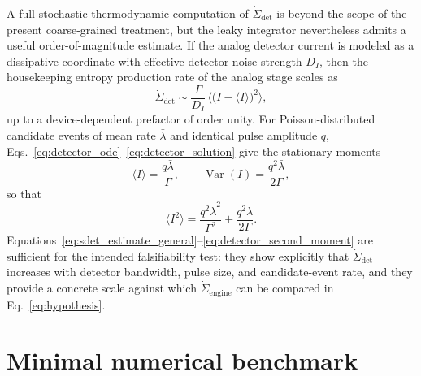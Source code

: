 \documentclass[aps,pre,reprint,amsmath,amssymb,floatfix,nofootinbib]{revtex4-2}
\newcommand{\avg}[1]{\langle #1 \rangle}
\newcommand{\Sdot}{\dot{\Sigma}}
\begin{document}
A full stochastic-thermodynamic computation of $\Sdot_{\mathrm{det}}$ is
beyond the scope of the present coarse-grained treatment, but the leaky
integrator nevertheless admits a useful order-of-magnitude estimate. If the
analog detector current is modeled as a dissipative coordinate with
effective detector-noise strength $D_I$, then the housekeeping entropy
production rate of the analog stage scales as
\begin{equation}
  \Sdot_{\mathrm{det}}
  \sim
  \frac{\Gamma}{D_I}\,\avg{\big(I-\avg{I}\big)^2},
  \label{eq:sdet_estimate_general}
\end{equation}
up to a device-dependent prefactor of order unity. For Poisson-distributed
candidate events of mean rate $\bar\lambda$ and identical pulse amplitude
$q$, Eqs.~\eqref{eq:detector_ode}--\eqref{eq:detector_solution} give the
stationary moments
\begin{equation}
  \avg{I}=\frac{q\bar\lambda}{\Gamma},
  \qquad
  \operatorname{Var}(I)=\frac{q^2\bar\lambda}{2\Gamma},
  \label{eq:detector_moments}
\end{equation}
so that
\begin{equation}
  \avg{I^2}=
  \frac{q^2\bar\lambda^2}{\Gamma^2}
  +
  \frac{q^2\bar\lambda}{2\Gamma}.
  \label{eq:detector_second_moment}
\end{equation}
Equations~\eqref{eq:sdet_estimate_general}--\eqref{eq:detector_second_moment}
are sufficient for the intended falsifiability test: they show explicitly
that $\Sdot_{\mathrm{det}}$ increases with detector bandwidth, pulse size,
and candidate-event rate, and they provide a concrete scale against which
$\Sdot_{\mathrm{engine}}$ can be compared in Eq.~\eqref{eq:hypothesis}.

\section{Minimal numerical benchmark}
\label{sec:numerics}
\end{document}

